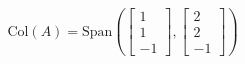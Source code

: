 \documentclass[preview]{standalone}
\begin{document}
\begin{align*}
\text{Col}(A)  = \text{Span}\left(\begin{bmatrix} 1 \\ 1 \\ -1 \end{bmatrix}, \begin{bmatrix} 2 \\ 2 \\ -1 \end{bmatrix}\right)
\end{align*}
\end{document}
